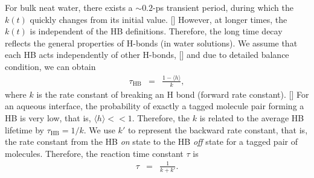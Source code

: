 For bulk neat water, there exists a $\sim 0.2$-ps transient period,
during which the $k(t)$ quickly changes from its initial value. [\cite{FWS00}]
However, at longer times, the $k(t)$ is independent of the HB definitions.
Therefore, the long time decay reflects the general properties of H-bonds (in water solutions).
We assume that each HB acts independently of other H-bonds, [\cite{AL96,AL00}] 
and due to detailed balance condition, we can obtain 
\begin{eqnarray}
  \tau_{\text{HB}} &=& \frac{1- \langle h\rangle}{k},
\label{eq:rate}
\end{eqnarray}
where $k$ is the rate constant of breaking an H bond (forward rate constant). [\cite{Chandler1986,Chandler1978}] 
For an aqueous interface, the probability of exactly a tagged molecule pair forming a HB is very low, that is, $\langle h\rangle << 1$. Therefore,
the $k$ is related to the average HB lifetime by $\tau_{\text{HB}}=1/k$.
We use $k'$ to represent the backward rate constant, that is, the rate constant from the HB \emph{on} state to the HB \emph{off} state for a tagged pair of molecules.
Therefore, the reaction time constant $\tau$ is 
\begin{eqnarray}
  \tau &=& \frac{1}{k+k'}.
\label{eq:reaction_rate_tau}
\end{eqnarray}


\FloatBarrier
